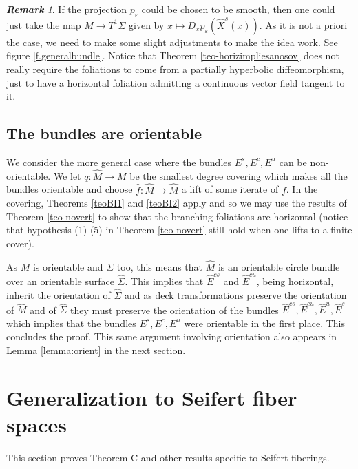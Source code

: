 \documentclass[11pt]{amsart} %
\newcommand{\Es}{E^s}
\newcommand{\Ec}{E^c}
\newcommand{\Eu}{E^u}
\newcommand{\Ecu}{E^{cu}}
\newcommand{\Ecs}{E^{cs}}
\newcommand{\eps}{\varepsilon}
\numberwithin{equation}{section}
\theoremstyle{remark}
\newtheorem*{remark} {\textbf{Remark}}
\begin{document}
\begin{remark}
If the projection $p_\eps$ could be chosen to be smooth, then one could just take the map $M \to T^1\Sigma$ given by $x \mapsto D_xp_\eps(\hat X^s(x))$. As it is not a priori the case, we need to make some slight adjustments to make the idea work. See figure \ref{f.generalbundle}. Notice that Theorem \ref{teo-horizimpliesanosov} does not really require the foliations to come from a partially hyperbolic diffeomorphism, just to have a horizontal foliation admitting a continuous vector field tangent to it. 
\end{remark}

\subsection{The bundles are orientable}\label{ss.nonorientable} 


We consider the more general case where the bundles $\Es,\Ec,\Eu$ can be non-orientable. We let $q: \hat M \to M$ be the smallest degree covering which makes all the bundles orientable and choose $\hat f: \hat M \to \hat M$ a lift of some iterate of $f$. In the covering, Theorems \ref{teoBI1} and \ref{teoBI2} apply and so we may use the results of Theorem \ref{teo-novert} to show that the branching foliations are horizontal (notice that hypothesis (1)-(5) in Theorem \ref{teo-novert} still hold when one lifts to a finite cover). 

As $M$ is orientable and $\Sigma$ too, this means that $\hat M$ is an orientable circle bundle over an orientable surface $\hat \Sigma$. This implies that $\hat \Ecs$ and $\hat \Ecu$, being horizontal, inherit the orientation of $\hat \Sigma$ and as deck transformations preserve the orientation of $\hat M$ and of $\hat \Sigma$ they must preserve the orientation of the bundles $\hat \Ecs, \hat \Ecu, \hat \Eu, \hat \Es$ which implies that the bundles $\Es,\Ec,\Eu$ were orientable in the first place. This concludes the proof. 
This same argument involving orientation also appears in Lemma
\ref{lemma:orient} in the next section.

%
\section{Generalization to Seifert fiber spaces}\label{s.Seifert}

This section proves Theorem C %
and other results specific to Seifert
fiberings.
\end{document}
